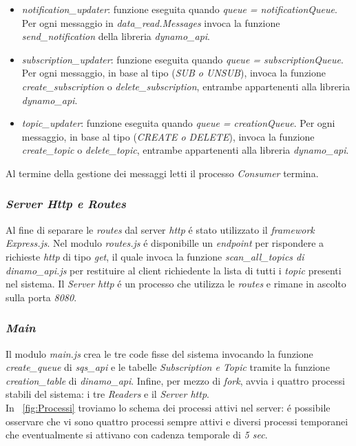 \documentclass{article}
\begin{document}
\begin{itemize}
\item{\textit{notification\_updater}: funzione eseguita quando \textit{queue = notificationQueue}. Per ogni messaggio in \textit{data\_read.Messages} invoca la funzione \textit{send\_notification} della libreria \textit{dynamo\_api}.}
\item{\textit{subscription\_updater}: funzione eseguita quando \textit{queue = subscriptionQueue}. Per ogni messaggio, in base al tipo (\textit{SUB o UNSUB}), invoca la funzione \textit{create\_subscription} o \textit{delete\_subscription}, entrambe appartenenti alla libreria \textit{dynamo\_api}.}
\item{\textit{topic\_updater}: funzione eseguita quando \textit{queue = creationQueue}. Per ogni messaggio, in base al tipo (\textit{CREATE o DELETE}), invoca la funzione \textit{create\_topic} o \textit{delete\_topic}, entrambe appartenenti alla libreria \textit{dynamo\_api}.}
\end{itemize}

Al termine della gestione dei messaggi letti il processo \textit{Consumer} termina.

\subsubsection{\textit{Server Http e Routes}}
Al fine di separare le \textit{routes} dal server \textit{http} \'e stato utilizzato il \textit{framework Express.js}. Nel modulo \textit{routes.js} \'e disponibille un \textit{endpoint} per rispondere a richieste \textit{http} di tipo \textit{get}, il quale invoca la funzione \textit{scan\_all\_topics di dinamo\_api.js} per restituire al client richiedente la lista di tutti i \textit{topic} presenti nel sistema. Il \textit{Server http} \'e un processo che utilizza le \textit{routes} e rimane in ascolto sulla porta \textit{8080}.

\subsubsection{\textit{Main}}
Il modulo \textit{main.js} crea le tre code fisse del sistema invocando la funzione \textit{create\_queue} di \textit{sqs\_api} e le tabelle \textit{Subscription e Topic} tramite la funzione \textit{creation\_table} di \textit{dinamo\_api}. Infine, per mezzo di \textit{fork}, avvia i quattro processi stabili del sistema: i tre \textit{Readers} e il \textit{Server http}. \\
In \figurename{~\ref{fig:Processi}} troviamo lo schema dei processi attivi nel server: \'e possibile osservare che vi sono quattro processi sempre attivi e diversi processi temporanei che eventualmente si attivano con cadenza temporale di \textit{5 sec}.
\end{document}
